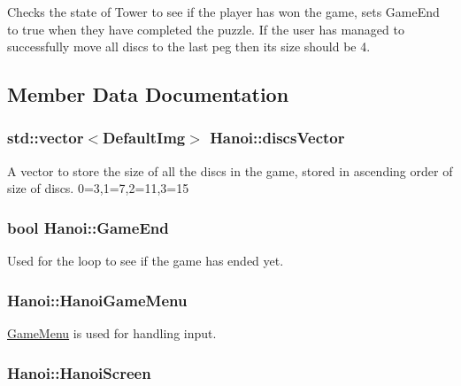 Checks the state of Tower to see if the player has won the game, sets Game\-End to true when they have completed the puzzle. If the user has managed to successfully move all discs to the last peg then its size should be 4. 

\subsection{Member Data Documentation}
\hypertarget{classHanoi_a67a8288cd0c9a1acc3e5201621505afa}{
\subsubsection[{discs\-Vector}]{\setlength{\rightskip}{0pt plus 5cm}std\-::vector$<${\bf Default\-Img}$>$ Hanoi\-::discs\-Vector\hspace{0.3cm}{\ttfamily [private]}}}\label{classHanoi_a67a8288cd0c9a1acc3e5201621505afa}
A vector to store the size of all the discs in the game, stored in ascending order of size of discs. 0=3,1=7,2=11,3=15 \hypertarget{classHanoi_aff7a10d6c208cb15d315436b91017bed}{
\subsubsection[{Game\-End}]{\setlength{\rightskip}{0pt plus 5cm}bool Hanoi\-::\-Game\-End\hspace{0.3cm}{\ttfamily [private]}}}\label{classHanoi_aff7a10d6c208cb15d315436b91017bed}


Used for the loop to see if the game has ended yet. 

\hypertarget{classHanoi_a7d73005d59c4f2134ffd564964ab3f49}{
\subsubsection[{Hanoi\-Game\-Menu}]{ Hanoi\-::\-Hanoi\-Game\-Menu\hspace{0.3cm}{\ttfamily [private]}}}\label{classHanoi_a7d73005d59c4f2134ffd564964ab3f49}


\hyperlink{classGameMenu}{Game\-Menu} is used for handling input. 

\hypertarget{classHanoi_a1b9bfd6a0428f772d78b66a5a3268c4c}{
\subsubsection[{Hanoi\-Screen}]{ Hanoi\-::\-Hanoi\-Screen\hspace{0.3cm}{\ttfamily [private]}}}\label{classHanoi_a1b9bfd6a0428f772d78b66a5a3268c4c}


